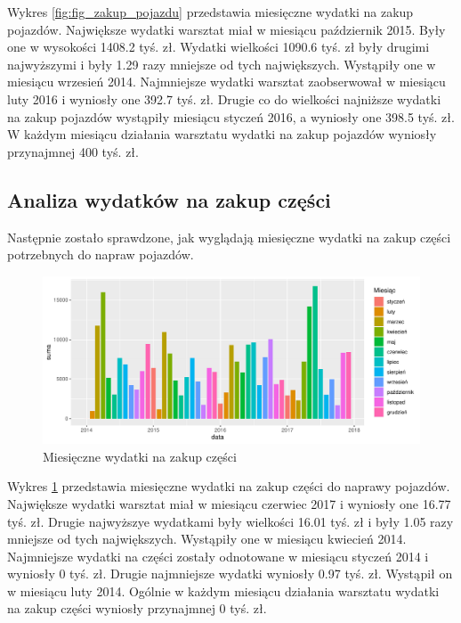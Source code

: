 \documentclass{article}\usepackage[]{graphicx}\usepackage[]{xcolor}
\makeatletter
\def\maxwidth{ %
  \ifdim\Gin@nat@width>\linewidth
    \linewidth
  \else
    \Gin@nat@width
  \fi
}
\newenvironment{knitrout}{}{} %
\makeatother
\begin{document}
Wykres \ref{fig:fig_zakup_pojazdu} przedstawia miesięczne wydatki na zakup pojazdów. 
Największe wydatki warsztat miał w miesiącu październik 2015. Były one w wysokości 1408.2 tyś. zł. 
Wydatki wielkości 1090.6 tyś. zł były drugimi najwyższymi i były 1.29 razy mniejsze od tych największych. Wystąpiły one w miesiącu wrzesień 2014.
Najmniejsze wydatki warsztat zaobserwował w miesiącu luty 2016 i wyniosły one 392.7 tyś. zł. 
Drugie co do wielkości najniższe wydatki na zakup pojazdów wystąpiły miesiącu styczeń 2016, a wyniosły one 398.5 tyś. zł.
W każdym miesiącu działania warsztatu wydatki na zakup pojazdów wyniosły przynajmnej 400 tyś. zł.

\subsection{Analiza wydatków na zakup części}

Następnie zostało sprawdzone, jak wyglądają miesięczne wydatki na zakup części potrzebnych do napraw pojazdów.

\begin{knitrout}
\color{fgcolor}\begin{figure}[H]

{\centering \includegraphics[width=\maxwidth]{figure/fig_zakup_czesci-1} 

}

\caption[Miesięczne wydatki na zakup części]{Miesięczne wydatki na zakup części}\label{fig:fig_zakup_czesci}
\end{figure}

\end{knitrout}

Wykres \ref{fig:fig_zakup_czesci} przedstawia miesięczne wydatki na zakup części do naprawy pojazdów.
Największe wydatki warsztat miał w miesiącu czerwiec 2017 i wyniosły one 16.77 tyś. zł. 
Drugie najwyższye wydatkami były wielkości 16.01 tyś. zł i były 1.05 razy mniejsze od tych największych. Wystąpiły one w miesiącu kwiecień 2014.
Najmniejsze wydatki na części zostały odnotowane w miesiącu styczeń 2014 i wyniosły 0 tyś. zł. 
Drugie najmniejsze wydatki wyniosły 0.97 tyś. zł. Wystąpił on w miesiącu luty 2014.
Ogólnie w każdym miesiącu działania warsztatu wydatki na zakup części wyniosły przynajmnej 0 tyś. zł.
\end{document}
